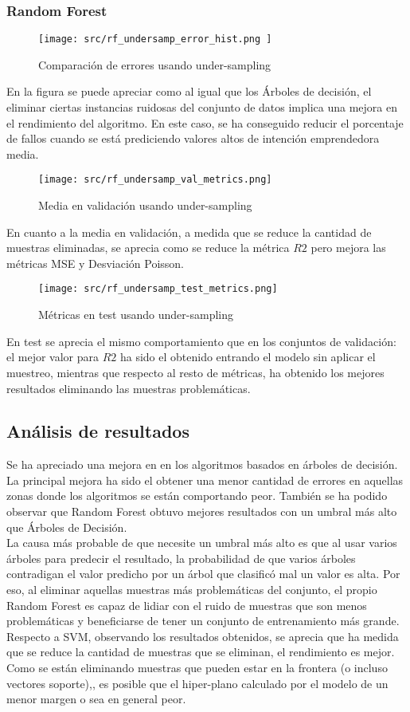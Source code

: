 \subsubsection*{Random Forest}
\begin{figure}[H]
	\centering
	\texttt{[image: src/rf\_undersamp\_error\_hist.png ]}
	\caption{Comparación de errores usando under-sampling}
	\label{fig:cmp_error_rf}
\end{figure}
En la figura se puede apreciar como al igual que los Árboles de decisión, el eliminar ciertas instancias ruidosas del conjunto de datos implica una mejora en el rendimiento del algoritmo. En este caso, se ha conseguido reducir el porcentaje de fallos cuando se está prediciendo valores altos de intención emprendedora media.
\begin{figure}[H]
	\centering
	\texttt{[image: src/rf\_undersamp\_val\_metrics.png]}
	\caption{Media en validación usando under-sampling}
	\label{fig:cmp_val_rf}
\end{figure}
En cuanto a la media en validación, a medida que se reduce la cantidad de muestras eliminadas, se aprecia como se reduce la métrica $R2$ pero mejora las métricas MSE y Desviación Poisson.
\begin{figure}[H]
	\centering
	\texttt{[image: src/rf\_undersamp\_test\_metrics.png]}
	\caption{Métricas en test usando under-sampling}
	\label{fig:cmp_test_rf}
\end{figure}
En test se aprecia el mismo comportamiento que en los conjuntos de validación: el mejor valor para $R2$ ha sido el obtenido entrando el modelo sin aplicar el  muestreo, mientras que respecto al resto de métricas, ha obtenido los mejores resultados eliminando las muestras problemáticas.\\
\subsection{Análisis de resultados}
Se ha apreciado una mejora en en los algoritmos basados en árboles de decisión. La principal mejora ha sido el obtener una menor cantidad de errores en aquellas zonas donde los algoritmos se están comportando peor. También se ha podido observar que Random Forest obtuvo mejores resultados con un umbral más alto que Árboles de Decisión. \\
La causa más probable de que necesite un umbral más alto es que al usar varios árboles para predecir el resultado, la probabilidad de que varios árboles contradigan el valor predicho por un árbol que clasificó mal un valor es alta. Por eso, al eliminar aquellas muestras más problemáticas del conjunto, el propio Random Forest es capaz de lidiar con el ruido de muestras que son menos problemáticas y beneficiarse de tener un conjunto de entrenamiento más grande.\\
\linebreak
Respecto a SVM, observando los resultados obtenidos, se aprecia que ha medida que se reduce la cantidad de muestras que se eliminan, el rendimiento es mejor.
Como se están eliminando muestras que pueden estar en la frontera (o incluso vectores soporte),, es posible que el hiper-plano calculado por el modelo de un menor margen o sea en general peor.
